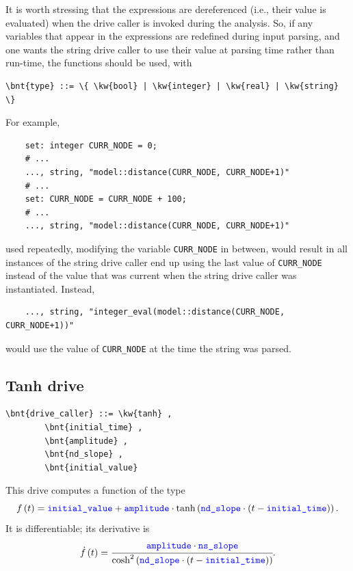 It is worth stressing that the expressions are dereferenced (i.e., their value is evaluated)
when the drive caller is invoked during the analysis.
So, if any variables that appear in the expressions are redefined during input parsing,
and one wants the string drive caller to use their value at parsing time rather than run-time,
the functions \texttt{} should be used, with
\begin{Verbatim}[commandchars=\\\{\}]
    \bnt{type} ::= \{ \kw{bool} | \kw{integer} | \kw{real} | \kw{string} \}
\end{Verbatim}
For example,
\begin{verbatim}
    set: integer CURR_NODE = 0;
    # ...
    ..., string, "model::distance(CURR_NODE, CURR_NODE+1)"
    # ...
    set: CURR_NODE = CURR_NODE + 100;
    # ...
    ..., string, "model::distance(CURR_NODE, CURR_NODE+1)"
\end{verbatim}
used repeatedly, modifying the variable \texttt{CURR\_NODE} in between, would result in all instances of the string drive caller end up using the last value of \texttt{CURR\_NODE} instead of the value that was current when the string drive caller was instantiated.
Instead,
\begin{verbatim}
    ..., string, "integer_eval(model::distance(CURR_NODE, CURR_NODE+1))"
\end{verbatim}
would use the value of \texttt{CURR\_NODE} at the time the string was parsed.




\subsection{Tanh drive}
\begin{Verbatim}[commandchars=\\\{\}]
    \bnt{drive_caller} ::= \kw{tanh} ,
        \bnt{initial_time} ,
        \bnt{amplitude} ,
        \bnt{nd_slope} ,
        \bnt{initial_value}
\end{Verbatim}
This drive computes a function of the type
\begin{displaymath}
	f\left( t \right) = \textcolor{blue}{\texttt{initial\_value}} + \textcolor{blue}{\texttt{amplitude}} \cdot\mathrm{tanh}\left( 
			\textcolor{blue}{\texttt{nd\_slope}} \cdot \left( 
				t - \textcolor{blue}{\texttt{initial\_time}}
			 \right)
		 \right) .
\end{displaymath}
It is differentiable; its derivative is
\begin{displaymath}
	\dot{f}\left( t \right) = \cfrac{\textcolor{blue}{\texttt{amplitude}} \cdot \textcolor{blue}{\texttt{ns\_slope}}}{\mathrm{cosh}^2\left( 
			\textcolor{blue}{\texttt{nd\_slope}} \cdot \left( 
				t - \textcolor{blue}{\texttt{initial\_time}}
			 \right)
		 \right)} .
\end{displaymath}

